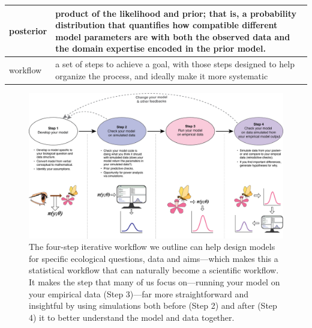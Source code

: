 \documentclass[11pt]{article}
\providecommand{\DIFaddbeginFL}{} %
\providecommand{\DIFaddendFL}{} %
\providecommand{\DIFdelbeginFL}{} %
\providecommand{\DIFdelendFL}{} %
\newcommand{\DIFscaledelfig}{0.5}
\newlength{\DIFdelgraphicswidth} %
\newlength{\DIFdelgraphicsheight} %
\newcommand{\DIFaddincludegraphics}[2][]{{\color{blue}\fbox{\DIFOincludegraphics[#1]{#2}}}} %
\newcommand{\DIFdelincludegraphics}[2][]{%
\sbox{\DIFdelgraphicsbox}{\DIFOincludegraphics[#1]{#2}}%
\settoboxwidth{\DIFdelgraphicswidth}{\DIFdelgraphicsbox} %
\settoboxtotalheight{\DIFdelgraphicsheight}{\DIFdelgraphicsbox} %
\scalebox{\DIFscaledelfig}{%
\parbox[b]{\DIFdelgraphicswidth}{\usebox{\DIFdelgraphicsbox}\\[-\baselineskip] \rule{\DIFdelgraphicswidth}{0em}}\llap{\resizebox{\DIFdelgraphicswidth}{\DIFdelgraphicsheight}{%
\setlength{\unitlength}{\DIFdelgraphicswidth}%
\begin{picture}(1,1)%
\thicklines\linethickness{2pt} %
{\color[rgb]{1,0,0}\put(0,0){\framebox(1,1){}}}%
{\color[rgb]{1,0,0}\put(0,0){\line( 1,1){1}}}%
{\color[rgb]{1,0,0}\put(0,1){\line(1,-1){1}}}%
\end{picture}%
}\hspace*{3pt}}} %
} %
\DeclareRobustCommand{\DIFaddbeginFL}{\DIFOaddbeginFL \let\includegraphics\DIFaddincludegraphics} %
\DeclareRobustCommand{\DIFaddendFL}{\DIFOaddendFL \let\includegraphics\DIFOincludegraphics} %
\DeclareRobustCommand{\DIFdelbeginFL}{\DIFOdelbeginFL \let\includegraphics\DIFdelincludegraphics} %
\DeclareRobustCommand{\DIFdelendFL}{\DIFOaddendFL \let\includegraphics\DIFOincludegraphics} %
\begin{document}
\begin{table}
\begin{tabular}{ p{3 cm}  p{13 cm} }
posterior & product of the likelihood and prior; that is, a probability distribution that quantifies how compatible different model parameters are with both the observed data and the domain expertise encoded in the prior model. \\\hline
workflow & a set of steps to achieve a goal, with those steps designed to help organize the process, and ideally make it more systematic  \\\hline
\hline
\end{tabular}
\label{tab:glossary}
\end{table}


\newpage

\begin{figure}[ht]
\centering
\noindent \DIFdelbeginFL %
\DIFdelendFL \DIFaddbeginFL \includegraphics[width=1\textwidth]{figures/workflow.png}
\DIFaddendFL \caption{The four-step iterative workflow we outline can help design models for specific ecological questions, data and aims---which makes this a statistical workflow that can naturally become a scientific workflow. It makes the step that many of us focus on---running your model on your empirical data (Step 3)---far more straightforward and insightful by using simulations both before (Step 2) and after (Step 4) it to better understand the model and data together.}
\label{fig:workflow}
\end{figure}
\end{document}
